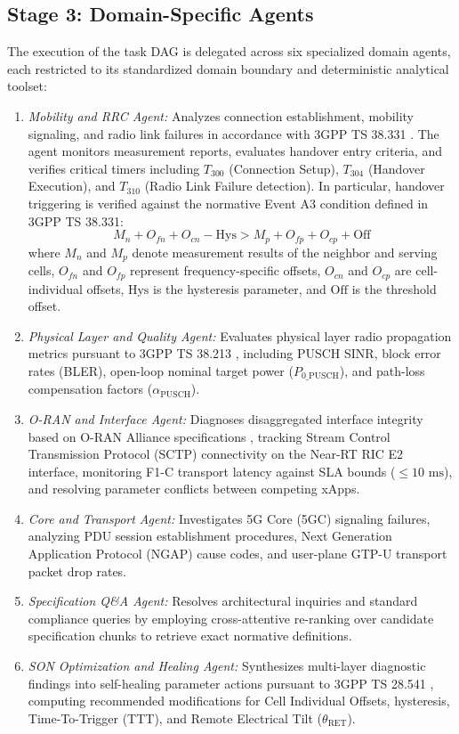\documentclass[conference]{IEEEtran}
\begin{document}
\subsection{Stage 3: Domain-Specific Agents}
The execution of the task DAG is delegated across six specialized domain agents, each restricted to its standardized domain boundary and deterministic analytical toolset:
\begin{enumerate}
    \item \textit{Mobility and RRC Agent:} Analyzes connection establishment, mobility signaling, and radio link failures in accordance with 3GPP TS 38.331 \cite{ts38331}. The agent monitors measurement reports, evaluates handover entry criteria, and verifies critical timers including $T_{300}$ (Connection Setup), $T_{304}$ (Handover Execution), and $T_{310}$ (Radio Link Failure detection). In particular, handover triggering is verified against the normative Event A3 condition defined in 3GPP TS 38.331:
    \begin{equation}
    M_n + O_{fn} + O_{cn} - \text{Hys} > M_p + O_{fp} + O_{cp} + \text{Off}
    \label{eq:event_a3}
    \end{equation}
    where $M_n$ and $M_p$ denote measurement results of the neighbor and serving cells, $O_{fn}$ and $O_{fp}$ represent frequency-specific offsets, $O_{cn}$ and $O_{cp}$ are cell-individual offsets, $\text{Hys}$ is the hysteresis parameter, and $\text{Off}$ is the threshold offset.
    \item \textit{Physical Layer and Quality Agent:} Evaluates physical layer radio propagation metrics pursuant to 3GPP TS 38.213 \cite{ts38213}, including PUSCH SINR, block error rates (BLER), open-loop nominal target power ($P_{0\_\text{PUSCH}}$), and path-loss compensation factors ($\alpha_{\text{PUSCH}}$).
    \item \textit{O-RAN and Interface Agent:} Diagnoses disaggregated interface integrity based on O-RAN Alliance specifications \cite{oran_e2ap}, tracking Stream Control Transmission Protocol (SCTP) connectivity on the Near-RT RIC E2 interface, monitoring F1-C transport latency against SLA bounds ($\le 10\text{ ms}$), and resolving parameter conflicts between competing xApps.
    \item \textit{Core and Transport Agent:} Investigates 5G Core (5GC) signaling failures, analyzing PDU session establishment procedures, Next Generation Application Protocol (NGAP) cause codes, and user-plane GTP-U transport packet drop rates.
    \item \textit{Specification Q\&A Agent:} Resolves architectural inquiries and standard compliance queries by employing cross-attentive re-ranking over candidate specification chunks to retrieve exact normative definitions.
    \item \textit{SON Optimization and Healing Agent:} Synthesizes multi-layer diagnostic findings into self-healing parameter actions pursuant to 3GPP TS 28.541 \cite{ts28541}, computing recommended modifications for Cell Individual Offsets, hysteresis, Time-To-Trigger (TTT), and Remote Electrical Tilt ($\theta_{\text{RET}}$).
\end{enumerate}
\end{document}
